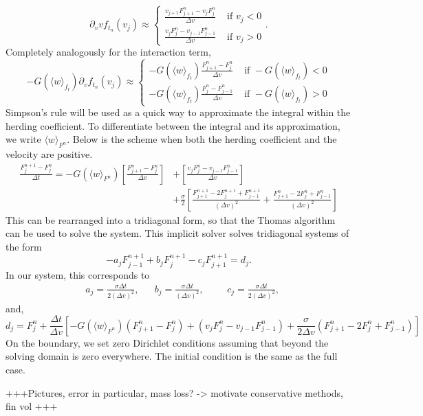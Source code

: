 \documentclass[11pt, a4pape draft]{article}
\begin{document}
			\[
				\partial_v v f_{t_n}(v_j) \approx\begin{cases}
													\frac{v_{j+1}F^n_{j+1} - v_jF^n_{j}}{\Delta v} & \text{ if } v_j < 0\\
													\frac{v_{j}F^n_{j} - v_{j-1}F^n_{j-1}}{\Delta v} & \text{ if } v_j > 0
												\end{cases}.
			\]
			Completely analogously for the interaction term,
			\[
				-G(\langle w\rangle_{f_t}) \partial_v f_{t_n}(v_j) \approx\begin{cases}
				-G(\langle w\rangle_{f_t}) \frac{F^n_{j+1} - F^n_{j}}{\Delta v} & \text{ if } 	-G(\langle w\rangle_{f_t}) < 0\\
				-G(\langle w\rangle_{f_t}) \frac{F^n_{j} - F^n_{j-1}}{\Delta v} & \text{ if } 	-G(\langle w\rangle_{f_t}) > 0
				\end{cases}
			\] 
			Simpson's rule will be used as a quick way to approximate the integral within the herding coefficient. To differentiate between the integral and its approximation, we write \(\langle w\rangle_{F^n}\). Below is the scheme when both the herding coefficient and the velocity are positive.
			\begin{equation*}
			\begin{split}
				\frac{F_j^{n+1} - F_j^n}{\Delta t} = 	-G(\langle w\rangle_{F^n})\left[ \frac{F^n_{j+1} - F^n_{j}}{\Delta v}\right] &+\left[ \frac{v_{j}F^n_{j} - v_{j-1}F^n_{j-1}}{\Delta v}\right]\\ &+ \frac{\sigma}{2}\left[ \frac{F^{n+1}_{j+1} - 2F^{n+1}_j + F^{n+1}_{j-1}}{(\Delta v)^2} + \frac{F^{n}_{j+1} - 2F^{n}_j + F^{n}_{j-1}}{(\Delta v)^2}\right] 	 
			\end{split}
			\end{equation*}
			This can be rearranged into a tridiagonal form, so that the Thomas algorithm can be used to solve the system. This implicit solver solves tridiagonal systems of the form 
			\[
				-a_jF^{n+1}_{j-1} + b_j F^{n+1}_j - c_jF^{n+1}_{j+1} = d_j.
			\] 
			In our system, this corresponds to
			\begin{align*}
				&a_j = \frac{\sigma \Delta t}{2(\Delta v)^2},&&b_j = \frac{\sigma \Delta t}{(\Delta v)^2}, &&&c_j = \frac{\sigma \Delta t}{2(\Delta v)^2},
			\end{align*}
			and,
			\[
				d_j = F^n_j + \frac{\Delta t}{\Delta v}\left[ -G(\langle w \rangle_{F^n})(F^n_{j+1} - F^n_j) + (v_jF_j^n - v_{j-1}F^n_{j-1}) + \frac{\sigma}{2\Delta v}(F^n_{j+1} - 2F^n_j + F^n_{j-1}) \right]
			\]
			On the boundary, we set zero Dirichlet conditions assuming that beyond the solving domain is zero everywhere. The initial condition is the same as the full case.
			
			+++Pictures, error in particular, mass loss? -> motivate conservative methods, fin vol +++
	
	
	\appendix
\end{document}
